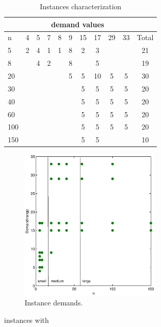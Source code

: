 \begin{table}[!h]
\centering
\begin{tabular}{| l | c c c c c c c c c | c |}
\hline
 & \multicolumn{9}{c|}{demand values} & \\ 
\hline
n & 4 & 5 & 7 & 8 & 9 & 15 & 17 & 29 & 33 & Total \\
\hline
5 & 2 & 4 & 1 & 1 & 8 & 2 & 3 &  &  & 21 \\ 
8 &  & 4 & 2 &  & 8 &  & 5 &  &  & 19 \\ 
20 &  &  &  &  & 5 & 5 & 10 & 5 & 5 & 30 \\ 
30 &  &  &  &  &  & 5 & 5 & 5 & 5 & 20 \\ 
40 &  &  &  &  &  & 5 & 5 & 5 & 5 & 20 \\ 
60 &  &  &  &  &  & 5 & 5 & 5 & 5 & 20 \\ 
100 &  &  &  &  &  & 5 & 5 & 5 & 5 & 20 \\ 
150 &  &  &  &  &  & 5 & 5 &  &  & 10 \\ 
\hline
\end{tabular}
\caption{Instances characterization}\label{tb:instances_characterization}
\end{table}

\begin{figure}[!htbp]
  \begin{center}
   \includegraphics[width=0.6\textwidth]{Images/Chapter5/instances.eps}
  \end{center}
    \caption{Instance demands.}\label{fig:instances}
\end{figure}

instances with 



